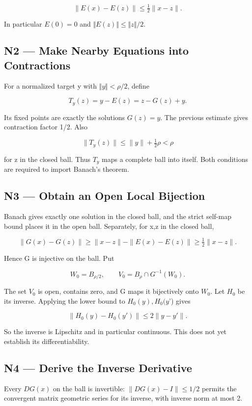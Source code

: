 \documentclass[preprint,12pt,aps,pra,showkeys,amsmath,amssymb,superscriptaddress,floatfix]{revtex4-2}
\theoremstyle{definition}
\theoremstyle{remark}
\begin{document}
\[\|E(x)-E(z)\|\le\tfrac12\|x-z\|.\]

In particular \(E(0)=0\) and \(\Vert E(z)\Vert \le \Vert z\Vert /2\).

\subsection{N2 --- Make Nearby Equations into
Contractions}\label{n2-make-nearby-equations-into-contractions}

For a normalized target y with \(\Vert y\Vert <\rho /2\), define

\[T_y(z)=y-E(z)=z-G(z)+y.\]

Its fixed points are exactly the solutions \(G(z)=y\). The previous
estimate gives contraction factor 1/2. Also

\[\|T_y(z)\|\le\|y\|+\tfrac12\rho<\rho\]

for z in the closed ball. Thus \(T_y\) maps a complete ball into itself.
Both conditions are required to import Banach's theorem.

\subsection{N3 --- Obtain an Open Local
Bijection}\label{n3-obtain-an-open-local-bijection}

Banach gives exactly one solution in the closed ball, and the strict
self-map bound places it in the open ball. Separately, for x,z in the
closed ball,

\[\|G(x)-G(z)\|\ge\|x-z\|-\|E(x)-E(z)\|\ge\tfrac12\|x-z\|.\]

Hence G is injective on the ball. Put

\[W_0=B_{\rho/2},\qquad V_0=B_\rho\cap G^{-1}(W_0).\]

The set \(V_0\) is open, contains zero, and G maps it bijectively onto
\(W_0\). Let \(H_0\) be its inverse. Applying the lower bound to
\(H_0(y),H_0(y\)') gives

\[\|H_0(y)-H_0(y')\|\le2\|y-y'\|.\]

So the inverse is Lipschitz and in particular continuous. This does not
yet establish its differentiability.

\subsection{N4 --- Derive the Inverse
Derivative}\label{n4-derive-the-inverse-derivative}

Every \(DG(x)\) on the ball is invertible: \(\|DG(x)-I\|\le1/2\) permits
the convergent matrix geometric series for its inverse, with inverse
norm at most 2.
\end{document}
